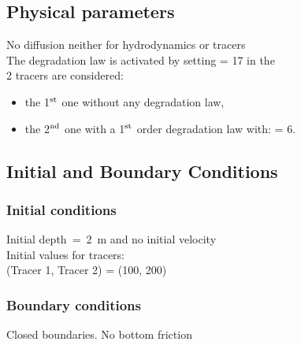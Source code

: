 \subsection{Physical parameters}
%
No diffusion neither for hydrodynamics or tracers\\
%
The degradation law is activated by setting  = 17
in the  \\

2 tracers are considered:
\begin{itemize}
\item the 1$^{\rm{st}}$ one without any degradation law,
\item the 2$^{\rm{nd}}$ one with a 1$^{\rm{st}}$ order degradation law with:
   = 6.
\end{itemize}

%
%
%
%
%
%
\subsection{Initial and Boundary Conditions}
%
\subsubsection{Initial conditions}
%
Initial depth~=~2~m
and no initial velocity\\
Initial values for tracers:\\
(Tracer 1, Tracer 2) =
(100, 200)
%
\subsubsection{Boundary conditions}
%
Closed boundaries. No bottom friction
%
